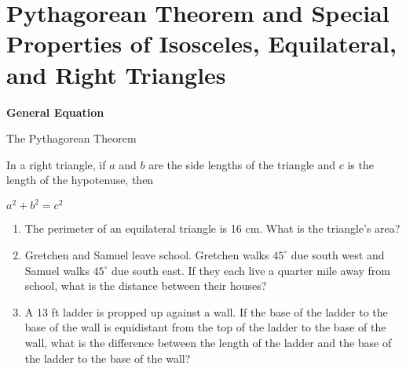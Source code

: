 \section[Special Triangles]{Pythagorean Theorem and Special Properties of Isosceles, Equilateral, and Right Triangles}

\textbf{General Equation}

\bigskip
\begin{equationbox}{The Pythagorean Theorem}
\begin{center}
In a right triangle, if $a$ and $b$ are the side lengths of the triangle and $c$ is the length of the hypotenuse, then

\bigskip
$a^2+b^2=c^2$
\end{center}
\end{equationbox}

\bigskip
\begin{enumerate}[labelindent=*,style=multiline,leftmargin=*,label=\textbf{Example \arabic*:}]
\item The perimeter of an equilateral triangle is 16 cm. What is the triangle's area?

\vfill\item Gretchen and Samuel leave school. Gretchen walks $45^\circ$ due south west and Samuel walks $45^\circ$ due south east. If they each live a quarter mile away from school, what is the distance between their houses?

\vfill\item A 13 ft ladder is propped up against a wall. If the base of the ladder to the base of the wall is equidistant from the top of the ladder to the base of the wall, what is the difference between the length of the ladder and the base of the ladder to the base of the wall?
\end{enumerate}

